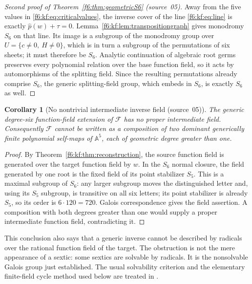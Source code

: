 \documentclass[11pt,a4paper]{article}
\newtheorem{corollary}[theorem]{Corollary}
\theoremstyle{definition}
\newcommand{\A}{\mathbb A}
\newcommand{\F}{\mathcal F}
\newcommand{\src}[1]{\textup{(source~#1)}}
\begin{document}
\begin{proof}[Second proof of Theorem~\ref{f6:thm:geometricS6} \src{05}]
Away from the five values in \eqref{f6:kf:eq:criticalvalues}, the inverse
cover of the line \eqref{f6:kf:eq:line} is exactly $\hat p(w)+\tau=0$.
Lemma~\ref{f6:kf:lem:transpositiongraph} gives monodromy $S_6$ on that line.
Its image is a subgroup of the monodromy group over
$U=\{c\ne0,\ H\ne0\}$, which is in turn a subgroup of the permutations of six
sheets; it must therefore be $S_6$. Analytic continuation of algebraic root
germs preserves every polynomial relation over the base function field, so
it acts by automorphisms of the splitting field. Since the resulting
permutations already comprise $S_6$, the generic splitting-field group,
which embeds in $S_6$, is exactly $S_6$ as well.
\end{proof}

\begin{corollary}[No nontrivial intermediate inverse field \src{05}]
\label{f6:kf:cor:indecomposable}
The generic degree-six function-field extension of $\F$ has no proper
intermediate field. Consequently $\F$ cannot be written as a composition of
two dominant generically finite polynomial self-maps of $\A^5$, each of
geometric degree greater than one.
\end{corollary}
\begin{proof}
By Theorem~\ref{f6:kf:thm:reconstruction}, the source function field is
generated over the target function field by $w$. In the $S_6$ normal closure,
the field generated by one root is the fixed field of its point stabilizer
$S_5$. This is a maximal subgroup of $S_6$: any larger subgroup moves the
distinguished letter and, using its $S_5$ subgroup, is transitive on all six
letters; its point stabilizer is already $S_5$, so its order is
$6\cdot120=720$. Galois correspondence gives the field assertion. A
composition with both degrees greater than one would supply a proper
intermediate function field, contradicting it.
\end{proof}

This conclusion also says that a generic inverse cannot be described by
radicals over the rational function field of the target. The obstruction is
not the mere appearance of a sextic: some sextics are solvable by radicals.
It is the nonsolvable Galois group just established. The usual solvability
criterion and the elementary finite-field cycle method used below are
treated in \cite[Chapters~3--5]{Milne}.

\end{document}
